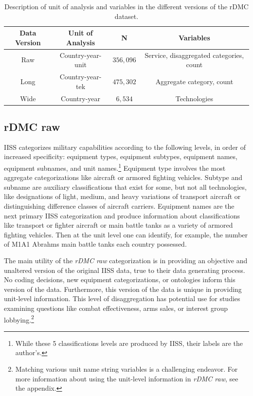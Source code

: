 \documentclass[
]{article}
\begin{document}
\begin{singlespace}   
    \begin{table}[h]
        \centering              
        \caption[Categories of military capabilities]{Description of unit of analysis and variables in the different versions of the rDMC dataset.}
    \begin{tabular}{|c|c|c|c|}
            \hline
            \textbf{Data Version} & \textbf{Unit of Analysis} & \textbf{N} & \textbf{Variables} \\
            \hline
            Raw & Country-year-unit & $356,096$ & Service, disaggregated categories, count \\
            \hline
            Long & Country-year-tek & $475,302$ & Aggregate category, count \\
            \hline
            Wide & Country-year & $6,534$ & Technologies \\
            \hline
        \end{tabular}
        \label{table:categories}
    \end{table}
    \end{singlespace}

\hypertarget{rdmc-raw}{%
\subsection{rDMC raw}\label{rdmc-raw}}

IISS categorizes military capabilities according to the following levels, in order of increased specificity: equipment types, equipment subtypes, equipment names, equipment subnames, and unit names.\footnote{While these 5 classifications levels are produced by IISS, their labels are the author's.} Equipment type involves the most aggregate categorizations like aircraft or armored fighting vehicles. Subtype and subname are auxiliary classifications that exist for some, but not all technologies, like designations of light, medium, and heavy variations of transport aircraft or distinguishing difference classes of aircraft carriers. Equipment names are the next primary IISS categorization and produce information about classifications like transport or fighter aircraft or main battle tanks as a variety of armored fighting vehicles. Then at the unit level one can identify, for example, the number of M1A1 Abrahms main battle tanks each country possessed.

The main utility of the \textit{rDMC raw} categorization is in providing an objective and unaltered version of the original IISS data, true to their data generating process. No coding decisions, new equipment categorizations, or ontologies inform this version of the data. Furthermore, this version of the data is unique in providing unit-level information. This level of disaggregation has potential use for studies examining questions like combat effectiveness, arms sales, or interest group lobbying.\footnote{Matching various unit name string variables is a challenging endeavor. For more information about using the unit-level information in \textit{rDMC raw}, see the appendix.}
\end{document}
